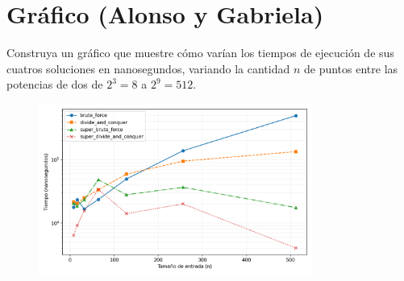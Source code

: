 \documentclass[main.tex]{subfiles}
\begin{document}
\section{Gráfico (Alonso y Gabriela)}
Construya un gráfico que muestre cómo varían los tiempos de ejecución de sus cuatros soluciones en
nanosegundos, variando la cantidad $n$ de puntos entre las potencias de dos de $2^3=8$ a $2^9=512$.

\begin{figure}[h]
	\centering \includegraphics[width=0.8\textwidth]{img/plot_all.png}
\end{figure}
\end{document}
